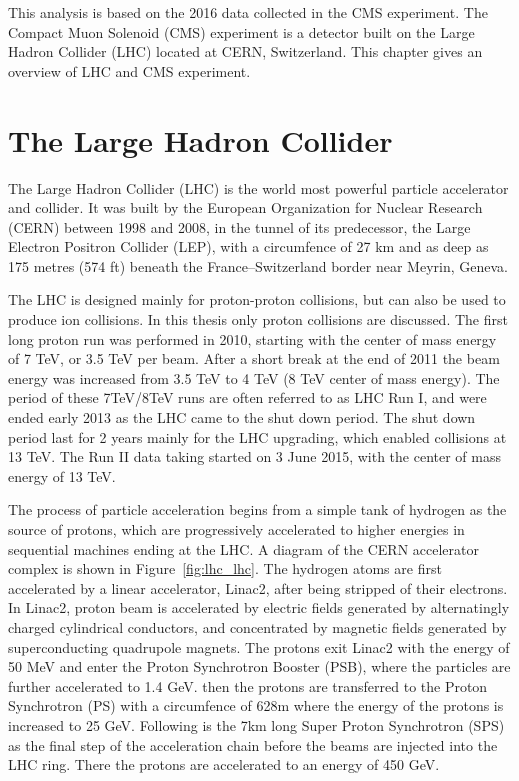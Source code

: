 
This analysis is based on the 2016 data collected in the CMS experiment. The Compact Muon Solenoid (CMS) experiment is a detector built on the Large Hadron Collider (LHC) located at CERN, Switzerland. This chapter gives an overview of LHC and CMS experiment.

\section{The Large Hadron Collider} 
The Large Hadron Collider (LHC) is the world most powerful particle accelerator and collider. It was built by the European Organization for Nuclear Research (CERN) between 1998 and 2008, in the tunnel of its predecessor, the Large Electron Positron Collider (LEP), with a circumfence of 27 km and as deep as 175 metres (574 ft) beneath the France–Switzerland border near Meyrin, Geneva. 

\vspace{0.3cm}
The LHC is designed mainly for proton-proton collisions, but can also be used to produce ion collisions. In this thesis only proton collisions are discussed. The first long proton run was performed in 2010, starting with the center of mass energy of 7 TeV, or 3.5 TeV per beam. After a short break at the end of 2011 the beam energy was increased from 3.5 TeV to 4 TeV (8 TeV center of mass energy). The period of these 7TeV/8TeV runs are often referred to as LHC Run I, and were ended early 2013 as the LHC came to the shut down period. The shut down period last for 2 years mainly for the LHC upgrading, which enabled collisions at 13 TeV. The Run II data taking started on 3 June 2015, with the center of mass energy of 13 TeV. 

\vspace{0.3cm}
The process of particle acceleration begins from a simple tank of hydrogen as the source of protons, which are progressively accelerated to higher energies in sequential machines ending at the LHC. A diagram of the CERN accelerator complex is shown in Figure~\ref{fig:lhc_lhc}. The hydrogen atoms are first accelerated by a linear accelerator, Linac2, after being stripped of their electrons. In Linac2, proton beam is accelerated by electric fields generated by alternatingly charged cylindrical conductors, and concentrated by magnetic fields generated by superconducting quadrupole magnets. The protons exit Linac2 with the energy of 50 MeV and enter the Proton Synchrotron Booster (PSB), where the particles are further accelerated to 1.4 GeV.  then the protons are transferred to the Proton Synchrotron (PS) with a circumfence of 628m where the energy of the protons is increased to 25 GeV. Following is the 7km long Super Proton Synchrotron (SPS) as the final step of the acceleration chain before the beams are injected into the LHC ring. There the protons are accelerated to an energy of 450 GeV.


